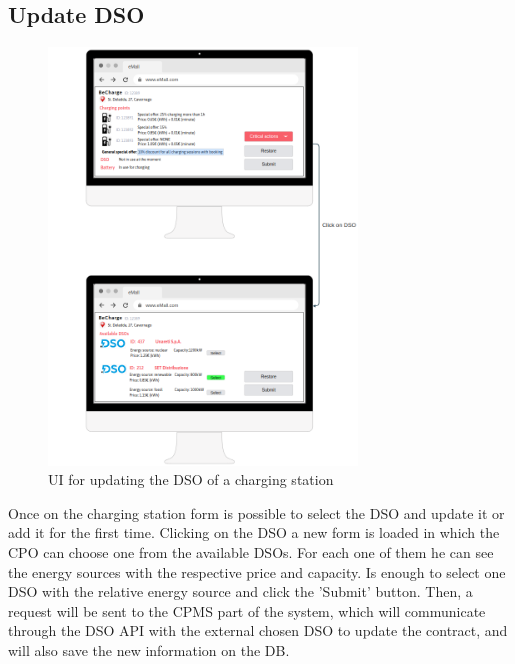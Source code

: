 \subsection{Update DSO}
\begin{figure}[H]
    \centering
    \includegraphics[width=0.73\textwidth]{Images/cp3/updateDSO.png}
    \caption{UI for updating the DSO of a charging station}
\end{figure}
Once on the charging station form is possible to select the DSO and update it or add it for the first time. Clicking on the DSO a new form is loaded in which the CPO can choose one from the available DSOs. For each one of them he can see the energy sources with the respective price and capacity. Is enough to select one DSO with the relative energy source and click the 'Submit' button. Then, a request will be sent to the CPMS part of the system, which will communicate through the DSO API with the external chosen DSO to update the contract, and will also save the new information on the DB. 

